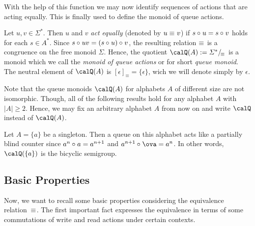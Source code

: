With the help of this function we may now identify sequences of actions that are acting equally. This is finally used to define the monoid of queue actions.

\begin{definition}
	Let $u,v\in\varSigma^*$. Then $u$ and $v$ \emph{act equally} (denoted by ${u\equiv_{} v}$) if $s\circ_{} u=s\circ_{} v$ holds for each $s\in A^*$.
	Since $s\circ_{} uv=(s\circ_{} u)\circ_{} v$, the resulting relation $\equiv_{}$
	is a congruence on the free monoid $\varSigma$. Hence, the
	quotient $\Qx(A):=\partition{\varSigma^*}{\equivx}$ is a monoid
	which we call the \emph{monoid of queue actions} or for short \emph{queue monoid}. 
	The neutral element of $\Qx(A)$ is $[\epsilon]_\equiv = \{\epsilon\}$, wich we will denote simply by $\epsilon$.
\end{definition}

Note that the queue monoids $\Qx(A)$ for alphabets $A$ of different size are not isomorphic. Though, all of the following results hold for any alphabet $A$ with $|A|\geq2$. Hence, we may fix an arbitrary alphabet $A$ from now on and write $\Qx$ instead of $\Qx(A)$.

\begin{remark}
	Let $A=\{a\}$ be a singleton. Then a queue on this alphabet acts like a partially blind counter since $a^n\circ_{} a=a^{n+1}$ and $a^{n+1}\opx\ova=a^n$. In other words, $\Qx(\{a\})$ is the bicyclic semigroup.
\end{remark}

\subsection{Basic Properties}
Now, we want to recall some basic properties considering the equivalence relation~$\equiv_{}$. The first important fact expresses the equivalence in terms of some commutations of write and read actions under certain contexts.

